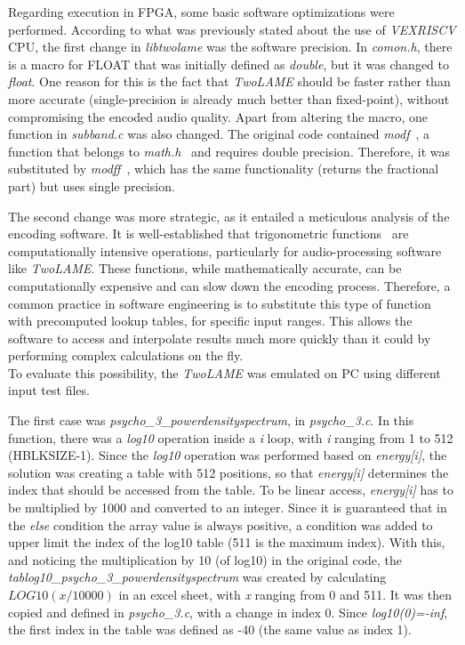 Regarding execution in FPGA, some basic software optimizations were performed.
According to what was previously stated about the use of \textit{VEXRISCV} CPU, the first change in \textit{libtwolame} was the software precision. In \textit{comon.h}, there is a macro for FLOAT that was initially defined as \textit{double}, but it was changed to \textit{float}. One reason for this is the fact that \textit{TwoLAME} should be faster rather than more accurate (single-precision is already much better than fixed-point), without compromising the encoded audio quality.
Apart from altering the macro, one function in \textit{subband.c} was also changed. The original code contained \textit{modf}~\cite{modf}, a function that belongs to \textit{math.h}~\cite{mathh} and requires double precision. Therefore, it was substituted by \textit{modff}~\cite{modf}, which has the same functionality (returns the fractional part) but uses single precision.

The second change was more strategic, as it entailed a meticulous analysis of the encoding software. It is well-established that trigonometric functions~\cite{trigonometric} are computationally intensive operations, particularly for audio-processing software like \textit{TwoLAME}. These functions, while mathematically accurate, can be computationally expensive and can slow down the encoding process. Therefore, a common practice in software engineering is to substitute this type of function with precomputed lookup tables, for specific input ranges. This allows the software to access and interpolate results much more quickly than it could by performing complex calculations on the fly.\\
To evaluate this possibility, the \textit{TwoLAME} was emulated on PC using different input test files.

The first case was \textit{psycho\_3\_powerdensityspectrum}, in \textit{psycho\_3.c}. In this function, there was a \textit{log10} operation inside a \textit{i} loop, with \textit{i} ranging from 1 to 512 (HBLKSIZE-1). Since the \textit{log10} operation was performed based on \textit{energy[i]}, the solution was creating a table with 512 positions, so that \textit{energy[i]} determines the index that should be accessed from the table. To be linear access, \textit{energy[i]} has to be multiplied by 1000 and converted to an integer. Since it is guaranteed that in the \textit{else} condition the array value is always positive, a condition was added to upper limit the index of the log10 table (511 is the maximum index). With this, and noticing the multiplication by 10 (of log10) in the original code, the \textit{tablog10\_psycho\_3\_powerdensityspectrum} was created by calculating $LOG10(x/10000)$ in an excel sheet, with \textit{x} ranging from 0 and 511. It was then copied and defined in \textit{psycho\_3.c}, with a change in index 0. Since \textit{log10(0)=-inf}, the first index in the table was defined as -40 (the same value as index 1).

